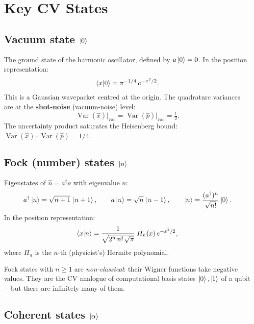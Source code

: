 \documentclass[11pt]{article}
\newcommand{\xh}{\hat{x}}
\newcommand{\ph}{\hat{p}}
\newcommand{\nh}{\hat{n}}
\newcommand{\ad}{a^{\dagger}}
\begin{document}
\section{Key CV States}
\label{sec:states}

\subsection{Vacuum state $\ket{0}$}

The ground state of the harmonic oscillator, defined by $a\ket{0} = 0$.
In the position representation:
\begin{equation}
\braket{x}{0} = \pi^{-1/4}\, e^{-x^2/2}.
\end{equation}
This is a Gaussian wavepacket centred at the origin.  The quadrature
variances are at the \textbf{shot-noise} (vacuum-noise) level:
\begin{equation}
\operatorname{Var}(\xh)\big|_{\text{vac}} =
\operatorname{Var}(\ph)\big|_{\text{vac}} = \tfrac{1}{2}.
\end{equation}
The uncertainty product saturates the Heisenberg bound:
$\operatorname{Var}(\xh)\cdot\operatorname{Var}(\ph) = 1/4$.

\subsection{Fock (number) states $\ket{n}$}

Eigenstates of $\nh = \ad a$ with eigenvalue $n$:
\begin{equation}
\ad\ket{n} = \sqrt{n+1}\,\ket{n+1}, \qquad
a\ket{n} = \sqrt{n}\,\ket{n-1}, \qquad
\ket{n} = \frac{(\ad)^n}{\sqrt{n!}}\ket{0}.
\end{equation}
In the position representation:
\begin{equation}
\braket{x}{n} = \frac{1}{\sqrt{2^n\, n!\,\sqrt{\pi}}}\;
H_n(x)\, e^{-x^2/2},
\end{equation}
where $H_n$ is the $n$-th (physicist's) Hermite polynomial.

Fock states with $n \geq 1$ are \emph{non-classical}: their Wigner
functions take negative values.
They are the CV analogue of computational basis states $\ket{0}, \ket{1}$
of a qubit---but there are infinitely many of them.

\subsection{Coherent states $\ket{\alpha}$}
\end{document}

